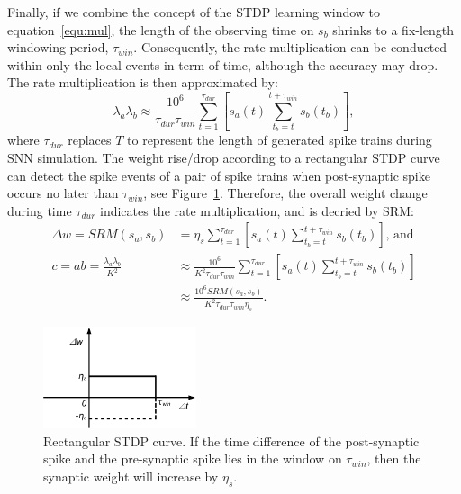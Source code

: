 Finally, if we combine the concept of the STDP learning window to equation~\ref{equ:mul}, the length of the observing time on $s_b$ shrinks to a fix-length windowing period, $\tau_{win}$.
Consequently, the rate multiplication can be conducted within only the local events in term of time, although the accuracy may drop.
The rate multiplication is then approximated by:
\begin{equation}
\lambda_a \lambda_b \approx \frac{10^6}{\tau_{dur} \tau_{win}} \sum_{t=1}^{\tau_{dur}} [s_a(t) \sum_{t_b=t}^{t+\tau_{win}} s_b(t_b)],
\end{equation} 
where $\tau_{dur}$ replaces $T$ to represent the length of generated spike trains during SNN simulation.
The weight rise/drop according to a rectangular STDP curve can detect the spike events of a pair of spike trains when post-synaptic spike occurs no later than $\tau_{win}$, see Figure~\ref{fig:rtg_stdp}.
Therefore, the overall weight change during time $\tau_{dur}$ indicates the rate multiplication, and is decried by SRM:
\begin{equation}
\begin{aligned}
\Delta w = SRM(s_a, s_b) &= \eta_s \sum_{t=1}^{\tau_{dur}} [s_a(t) \sum_{t_b=t}^{t+\tau_{win}} s_b(t_b)] \text{, and}\\
c=ab=\frac{\lambda_a \lambda_b}{K^2} &\approx \frac{10^6}{K^2 \tau_{dur} \tau_{win}} \sum_{t=1}^{\tau_{dur}} [s_a(t) \sum_{t_b=t}^{t+\tau_{win}} s_b(t_b)] \\
&\approx  \frac{10^6 SRM(s_a, s_b)}{K^2 \tau_{dur} \tau_{win}  \eta_s}.
\end{aligned}
\label{equ:srm}
\end{equation} 
\begin{figure}
	\centering
	\includegraphics[width=0.4\textwidth]{pics_sdlm/stdp.pdf}
	\caption{Rectangular STDP curve.
		If the time difference of the post-synaptic spike and the pre-synaptic spike lies in the window on $\tau_{win}$, then the synaptic weight will increase by $\eta_s$.}
	\label{fig:rtg_stdp}
\end{figure}

